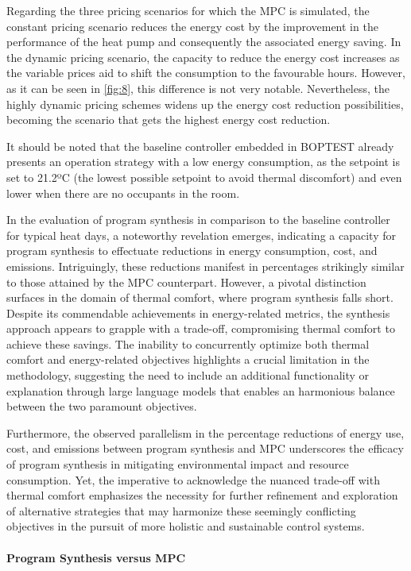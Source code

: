 Regarding the three pricing scenarios for which the MPC is simulated, the constant pricing scenario reduces the energy cost by the improvement in the performance of the heat pump and consequently the associated energy saving. In the dynamic pricing scenario, the capacity to reduce the energy cost increases as the variable prices aid to shift the consumption to the favourable hours. However, as it can be seen in \ref{fig:8}, this difference is not very notable. Nevertheless, the highly dynamic pricing schemes widens up the energy cost reduction possibilities, becoming the scenario that gets the highest energy cost reduction.

It should be noted that the baseline controller embedded in BOPTEST already presents an operation strategy with a low energy consumption, as the setpoint is set to 21.2ºC (the lowest possible setpoint to avoid thermal discomfort) and even lower when there are no occupants in the room.

In the evaluation of program synthesis in comparison to the baseline controller for typical heat days, a noteworthy revelation emerges, indicating a capacity for program synthesis to effectuate reductions in energy consumption, cost, and emissions. Intriguingly, these reductions manifest in percentages strikingly similar to those attained by the MPC counterpart. However, a pivotal distinction surfaces in the domain of thermal comfort, where program synthesis falls short. Despite its commendable achievements in energy-related metrics, the synthesis approach appears to grapple with a trade-off, compromising thermal comfort to achieve these savings. The inability to concurrently optimize both thermal comfort and energy-related objectives highlights a crucial limitation in the methodology, suggesting the need to include an additional functionality or explanation through large language models that enables an harmonious balance between the two paramount objectives.

Furthermore, the observed parallelism in the percentage reductions of energy use, cost, and emissions between program synthesis and MPC underscores the efficacy of program synthesis in mitigating environmental impact and resource consumption. Yet, the imperative to acknowledge the nuanced trade-off with thermal comfort emphasizes the necessity for further refinement and exploration of alternative strategies that may harmonize these seemingly conflicting objectives in the pursuit of more holistic and sustainable control systems.

\paragraph{Program Synthesis versus MPC}

